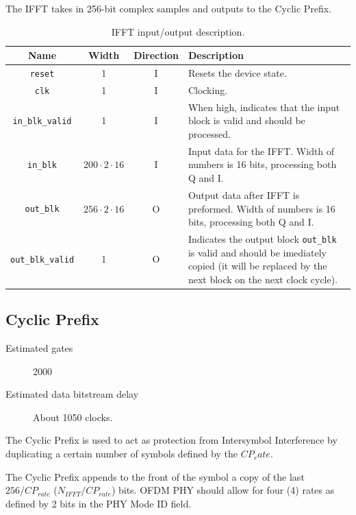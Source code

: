 \documentclass[dvips,10pt,twocolumn]{article}
\newcommand{\wire}{\texttt}
\begin{document}
	The IFFT takes in 256-bit complex samples and outputs to the Cyclic Prefix.

\begin{table}
	\begin{tabularx}{\linewidth}{c|c|c|X}
		\label{tbl:ifft-io}
			
	Name & Width & Direction & Description \\ \hline

	\wire{reset} & 1 & I & Resets the device state. \\

	\wire{clk}   & 1 & I & Clocking. \\

	\wire{in\_blk\_valid} & 1 & I & When high, indicates that the input block is
	valid and should be processed. \\

	\wire{in\_blk} & $200 \cdot 2 \cdot 16$ & I & Input data for the IFFT. Width of
	numbers is 16 bits, processing both Q and I. \\

	\wire{out\_blk} & $256 \cdot 2 \cdot 16$ & O & Output data after IFFT is preformed. Width of
	numbers is 16 bits, processing both Q and I. \\

	\wire{out\_blk\_valid} & 1 & O & Indicates the output block
	\wire{out\_blk} is valid and should be imediately copied (it will be
	replaced by the next block on the next clock cycle).

\end{tabularx}
\caption{IFFT input/output description.}
\end{table}



\subsection{Cyclic Prefix}
\label{sec:cyclic_prefix}
\begin{description}
	\item[Estimated gates] 2000
	\item[Estimated data bitstream delay] About 1050 clocks.
\end{description}

The Cyclic Prefix is used to act as protection from Intersymbol Interference 
by duplicating a certain number of symbols defined by the $CP_rate$.

The Cyclic Prefix appends to the front of the symbol a copy of the last
$256/CP_{rate}$ ($N_{IFFT}/CP_{rate}$) bits. OFDM PHY should allow for four
(4) rates as defined by 2 bits in the PHY Mode ID field. 
\end{document}
